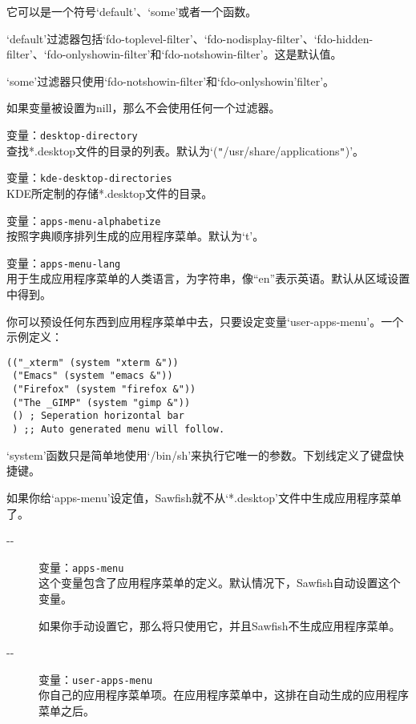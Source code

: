 \documentclass{book}
\begin{document}
\begin{CJK*}{UTF8}{gbsn}
\begin{description}
它可以是一个符号`default'、`some'或者一个函数。

`default'过滤器包括`fdo-toplevel-filter'、`fdo-nodisplay-filter'、`fdo-hidden-filter'、`fdo-onlyshowin-filter'和`fdo-notshowin-filter'。这是默认值。

`some'过滤器只使用`fdo-notshowin-filter'和`fdo-onlyshowin'filter'。

如果变量被设置为nill，那么不会使用任何一个过滤器。
\item[-{}-] 变量：\verb|desktop-directory|\\
查找*.desktop文件的目录的列表。默认为`(\verb|"|/usr/share/applications\verb|"|)'。
\item[-{}-] 变量：\verb|kde-desktop-directories|\\
KDE所定制的存储*.desktop文件的目录。
\item[-{}-] 变量：\verb|apps-menu-alphabetize|\\
按照字典顺序排列生成的应用程序菜单。默认为`t'。
\item[-{}-] 变量：\verb|apps-menu-lang|\\
用于生成应用程序菜单的人类语言，为字符串，像``en''表示英语。默认从区域设置中得到。
\end{description}

你可以预设任何东西到应用程序菜单中去，只要设定变量`user-apps-menu'。一个示例定义：
\begin{verbatim}
(("_xterm" (system "xterm &"))
 ("Emacs" (system "emacs &"))
 ("Firefox" (system "firefox &"))
 ("The _GIMP" (system "gimp &"))
 () ; Seperation horizontal bar
 ) ;; Auto generated menu will follow.
\end{verbatim}
`system'函数只是简单地使用`/bin/sh'来执行它唯一的参数。下划线定义了键盘快捷键。

如果你给`apps-menu'设定值，Sawfish就不从`*.desktop'文件中生成应用程序菜单了。
\begin{description}
\item[-{}-] 变量：\verb|apps-menu|\\
这个变量包含了应用程序菜单的定义。默认情况下，Sawfish自动设置这个变量。

如果你手动设置它，那么将只使用它，并且Sawfish不生成应用程序菜单。
\item[-{}-] 变量：\verb|user-apps-menu|\\
你自己的应用程序菜单项。在应用程序菜单中，这排在自动生成的应用程序菜单之后。
\end{description}

\end{CJK*}
\end{document}
